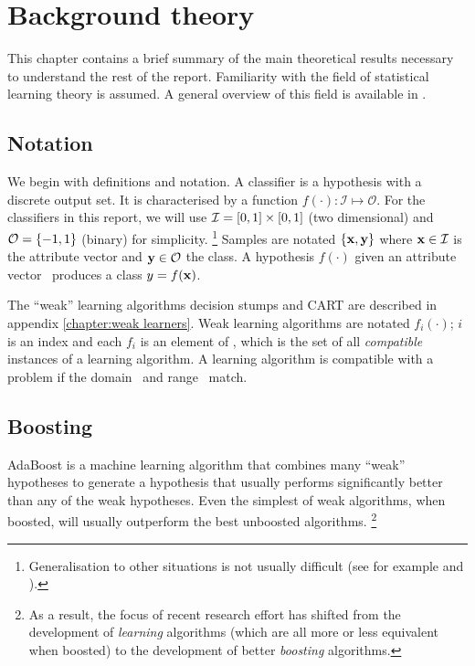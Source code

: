 


\chapter{Background theory}
\label{chapter:theory}

This chapter contains a brief summary of the main theoretical results
necessary to understand the rest of the report.  Familiarity with the
field of statistical learning theory is assumed.  A general overview
of this field is available in \cite{Cherkassky98}.


\section{Notation}

We begin with definitions and notation.  A classifier is a hypothesis
with a discrete output set.  It is characterised by a
function $f(\cdot) : \mathcal{I} \mapsto \mathcal {O}$.  For the
classifiers in this report, we will use $\mathcal{I} = [0,1] \times [0,1]$ (two
dimensional) and $\mathcal{O} = \{-1,1\}$ (binary) for simplicity.
\footnote{Generalisation to other situations is not
usually difficult (see for example \cite{Freund96} and
\cite{Cherkassky98}).}  Samples are notated $\{\mathbf{x}, \mathbf{y}\}$ where
$\mathbf{x} \in \mathcal{I}$ is the attribute vector and $\mathbf{y} \in \mathcal{O}$ the
class.  A hypothesis $f(\cdot)$ given an attribute vector \bfx\
produces a class $y = f(\mathbf{x})$.

The ``weak'' learning algorithms decision stumps and CART are
described in appendix \ref{chapter:weak learners}.  Weak learning
algorithms are notated $f_i(\cdot)$; $i$ is an
index and each $f_i$ is an element of \calF, which is the set of all
\emph{compatible} instances of a learning algorithm.  A learning
algorithm is compatible with a problem if the domain \calI\ and range
\calO\ match.


\section{Boosting}

AdaBoost is a machine learning algorithm
that combines many ``weak'' hypotheses to generate a hypothesis 
that usually performs significantly better than any of the weak
hypotheses.  Even the simplest of weak algorithms, when
boosted, will usually outperform the best unboosted algorithms.
\footnote{As a result, the focus of recent research effort has shifted from the
development of \emph{learning} algorithms (which are all more
or less equivalent when boosted) to the development of better \emph{boosting}
algorithms.}


